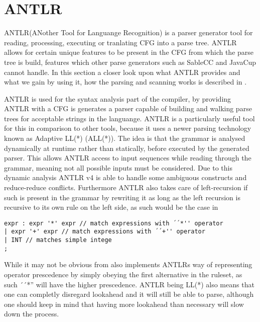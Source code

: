 \section{ANTLR}
ANTLR(ANother Tool for Languange Recognition) is a parser generator tool for reading, processing, executing or tranlating CFG into a parse tree.
ANTLR allows for certain unique features to be present in the CFG from which the parse tree is build, features which other parse generators such as SableCC and JavaCup cannot handle. 
In this section a closer look upon what ANTLR provides and what we gain by using it, how the parsing and scanning works is described in .

ANTLR is used for the syntax analysis part of the compiler, by providing ANTLR with a CFG is generates a parser capable of building and walking parse trees for acceptable strings in the languange.
ANTLR is a particularly useful tool for this in comparison to other tools, because it uses a newer parsing technology known as Adaptive LL(*) (ALL(*)).
The idea is that the grammar is analysed dynamically at runtime rather than statically, before executed by the generated parser.
This allows ANTLR access to input sequences while reading through the grammar, meaning not all possible inputs must be considered.
Due to this dynamic analysis ANTLR v4 is able to handle some ambiguous constructs and reduce-reduce conflicts.
Furthermore ANTLR also takes care of left-recursion if such is present in the grammar by rewriting it as long as the left recursion is recursive to its own rule on the left side, as such would be the case in 
\begin{lstlisting}[caption=An ambiguous rule for expr,frame=tlrb,label={lst:amb}]
expr : expr '*' expr // match expressions with ´´*'' operator
| expr '+' expr // match expressions with ´´+'' operator
| INT // matches simple intege
;
\end{lstlisting}
While it may not be obvious from  also implements ANTLRs way of representing operator prescedence by simply obeying the first alternative in the ruleset, as such ´´*'' will have the higher prescedence.
ANTLR being LL(*) also means that one can completly disregard lookahead and it will still be able to parse, although one should keep in mind that having more lookahead than necessary will slow down the process.

